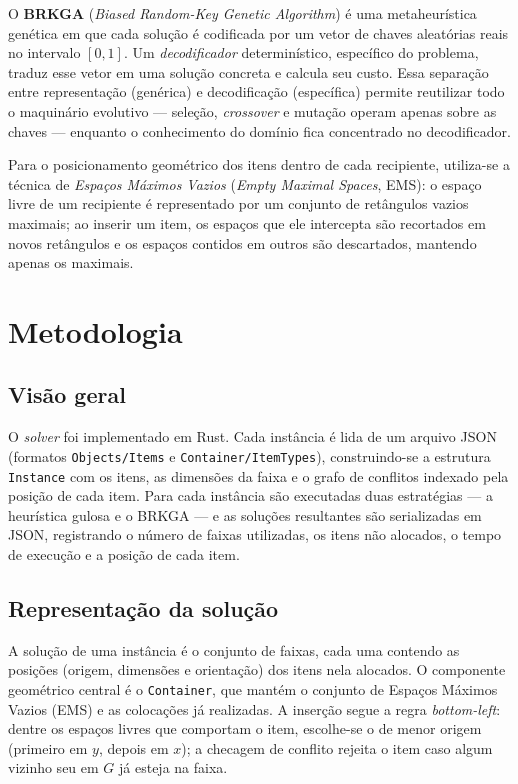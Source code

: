 \documentclass{report}
\begin{document}
O \textbf{BRKGA} (\textit{Biased Random-Key Genetic Algorithm}) é uma
metaheurística genética em que cada solução é codificada por um vetor de chaves
aleatórias reais no intervalo $[0,1]$. Um \emph{decodificador} determinístico,
específico do problema, traduz esse vetor em uma solução concreta e calcula seu
custo. Essa separação entre representação (genérica) e decodificação
(específica) permite reutilizar todo o maquinário evolutivo --- seleção,
\textit{crossover} e mutação operam apenas sobre as chaves --- enquanto o
conhecimento do domínio fica concentrado no decodificador.

Para o posicionamento geométrico dos itens dentro de cada recipiente,
utiliza-se a técnica de \emph{Espaços Máximos Vazios} (\textit{Empty Maximal
Spaces}, EMS): o espaço livre de um recipiente é representado por um conjunto de
retângulos vazios maximais; ao inserir um item, os espaços que ele intercepta
são recortados em novos retângulos e os espaços contidos em outros são
descartados, mantendo apenas os maximais.

\chapter{Metodologia}
\label{sec:metodologia}

\section{Visão geral}

O \textit{solver} foi implementado em Rust. Cada instância é lida de um arquivo
JSON (formatos \texttt{Objects/Items} e \texttt{Container/ItemTypes}),
construindo-se a estrutura \texttt{Instance} com os itens, as dimensões da faixa
e o grafo de conflitos indexado pela posição de cada item. Para cada instância
são executadas duas estratégias --- a heurística gulosa e o BRKGA --- e as
soluções resultantes são serializadas em JSON, registrando o número de faixas
utilizadas, os itens não alocados, o tempo de execução e a posição de cada item.

\section{Representação da solução}

A solução de uma instância é o conjunto de faixas, cada uma contendo as
posições (origem, dimensões e orientação) dos itens nela alocados. O componente
geométrico central é o \texttt{Container}, que mantém o conjunto de Espaços
Máximos Vazios (EMS) e as colocações já realizadas. A inserção segue a regra
\textit{bottom-left}: dentre os espaços livres que comportam o item, escolhe-se
o de menor origem (primeiro em $y$, depois em $x$); a checagem de conflito
rejeita o item caso algum vizinho seu em $G$ já esteja na faixa.
\end{document}
